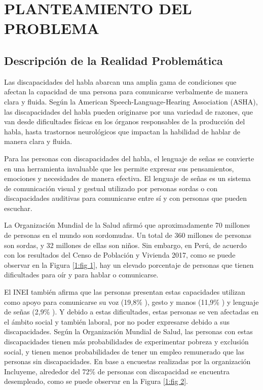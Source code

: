 \chapter{PLANTEAMIENTO DEL PROBLEMA}
\section{Descripción de la Realidad Problemática}

Las discapacidades del habla abarcan una amplia gama de condiciones que afectan la capacidad de una persona para comunicarse verbalmente de manera clara y fluida. Según la American Speech-Language-Hearing Association (ASHA), las discapacidades del habla pueden originarse por una variedad de razones, que van desde dificultades físicas en los órganos responsables de la producción del habla, hasta trastornos neurológicos que impactan la habilidad de hablar de manera clara y fluida.

Para las personas con discapacidades del habla, el lenguaje de señas se convierte en una herramienta invaluable que les permite expresar sus pensamientos, emociones y necesidades de manera efectiva. El lenguaje de señas es un sistema de comunicación visual y gestual utilizado por personas sordas o con discapacidades auditivas para comunicarse entre sí y con personas que pueden escuchar.

La Organización Mundial de la Salud afirmó que aproximadamente 70 millones de personas en el mundo son sordomudas. Un total de 360 millones de personas son sordas, y 32 millones de ellas son niños. Sin embargo, en Perú, de acuerdo con los resultados del Censo de Población y Vivienda 2017, como se puede observar en la Figura \ref{1:fig 1}, hay un elevado porcentaje de personas que tienen dificultades para oír y para hablar o comunicarse.

El INEI también afirma que las personas presentan estas capacidades utilizan como apoyo para comunicarse su voz (19,8\% ), gesto y manos (11,9\% ) y lenguaje de señas (2,9\% ). Y debido a estas dificultades, estas personas se ven afectadas en el ámbito social y también laboral, por no poder expresarse debido a sus discapacidades. Según la Organización Mundial de Salud, las personas con estas discapacidades tienen más probabilidades de experimentar pobreza y exclusión social, y tienen menos probabilidades de tener un empleo remunerado que las personas sin discapacidades. En base a encuestas realizadas por la organización Incluyeme, alrededor del 72\% de personas con discapacidad se encuentra desempleado, como se puede observar en la Figura \ref{1:fig 2}.


